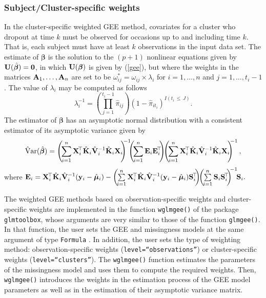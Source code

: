 \subsubsection{Subject/Cluster-specific weights}
In the cluster-specific weighted GEE method, covariates for a cluster who dropout at time $k$ must be observed for occasions up to and including time $k$. That is, each subject must have at least $k$ observations in the input data set. The estimate of $\bm{\beta}$ is the solution to the $(p+1)$ nonlinear equations given by ${\bf U}(\hat{\bm{\beta}})={\bf 0}$, in which ${\bf U}(\bm{\beta})$ is given by (\ref{gee}), but where the weights in the matrices ${\bf A}_1,\ldots,{\bf A}_n$ are set to be $\omega_{ij}^*=\omega_{ij}\times\lambda_i$ for $i=1,\ldots,n$ and $j=1,\ldots,t_i-1$. The value of $\lambda_i$ may be computed as follows
$$\lambda_i^{-1}=\left(\!\prod\limits_{j=1}^{t_i-1} \hat{\pi}_{ij}\!\right)\!\!(1-\hat{\pi}_{it_i})^{I(t_i\,\leq\, J)}.$$
The estimator of $\bm{\beta}$ has an asymptotic normal distribution with a consistent estimator of its asymptotic variance given by \citep{RRZ95,PLR02}
$${\rm \hat{V}ar}(\hat{\bm{\beta}})=\left(\!\sum\limits_{i=1}^n {\bf X}_i^{\!\top}\hat{\bf K}_i\hat{\bf V}_i^{-1}\hat{\bf K}_i{\bf X}_i\!\!\right)^{\!\!\!-1}\!\!\!\left(\!\sum\limits_{i=1}^n {\bf E}_i{\bf E}_i^{\!\top}\!\!\right)\!\!\left(\!\sum\limits_{i=1}^n {\bf X}_i^{\!\top}\hat{\bf K}_i\hat{\bf V}_i^{-1}\hat{\bf K}_i{\bf X}_i\!\!\right)^{\!\!\!-1},$$
where ${\bf E}_i={\bf X}_i^{\!\top}\hat{\bf K}_i\hat{\bf V}_i^{-1}({\bf y}_i-\hat{\bm{\mu}}_i)-\left(\!\sum\limits_{i=1}^n {\bf X}_i^{\!\top}\hat{\bf K}_i\hat{\bf V}_i^{-1}({\bf y}_i-\hat{\bm{\mu}}_i){\bf S}_i^{\!\top}\!\!\right)\!\!\left(\!\sum\limits_{i=1}^n {\bf S}_i{\bf S}_i^{\!\top}\!\!\right)^{\!\!-1}\!\!{\bf S}_i.$

The weighted GEE methods based on observation-specific weights and cluster-specific weights are implemented in the function {\tt wglmgee()} of the package {\tt glmtoolbox}, whose arguments are very similar to those of the function {\tt glmgee()}. In that function, the user sets the GEE and missingness models at the same argument of type {\tt Formula} \citep{Z10}. In addition, the user sets the type of weighting method: observation-specific weights ({\tt level=``observations''}) or cluster-specific weights ({\tt level=``clusters''}). The {\tt wglmgee()} function estimates the parameters of the missingness model and uses them to compute the required weights. Then, {\tt wglmgee()} introduces the weights in the estimation process of the GEE model parameters as well as in the estimation of their asymptotic variance matrix.

